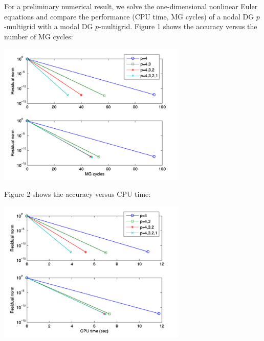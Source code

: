 \documentclass{report}
\begin{document}
For a preliminary numerical result, we solve the one-dimensional
nonlinear Euler equations and compare the performance (CPU time, MG
cycles) of a nodal DG $p$-multigrid with a modal DG $p$-multigrid.
Figure 1 shows the accuracy versus the number of MG cycles:
\begin{center}
\includegraphics[width=90mm]{KimDfig1}
\end{center}

Figure 2 shows the accuracy versus CPU time:
\begin{center}
\includegraphics[width=90mm]{KimDfig2}
\end{center}
\end{document}
